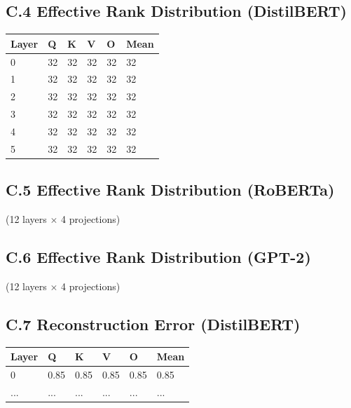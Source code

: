 \subsection{C.4 Effective Rank Distribution (DistilBERT)}

\begin{table}[H]
\centering
\small
\begin{tabular}{llllll}
\toprule
\textbf{Layer} & \textbf{Q} & \textbf{K} & \textbf{V} & \textbf{O} & \textbf{Mean} \\
\midrule
0 & 32 & 32 & 32 & 32 & 32 \\
1 & 32 & 32 & 32 & 32 & 32 \\
2 & 32 & 32 & 32 & 32 & 32 \\
3 & 32 & 32 & 32 & 32 & 32 \\
4 & 32 & 32 & 32 & 32 & 32 \\
5 & 32 & 32 & 32 & 32 & 32 \\
\bottomrule
\end{tabular}
\end{table}

\subsection{C.5 Effective Rank Distribution (RoBERTa)}

(12 layers $\times$ 4 projections)

\subsection{C.6 Effective Rank Distribution (GPT-2)}

(12 layers $\times$ 4 projections)

\subsection{C.7 Reconstruction Error (DistilBERT)}

\begin{table}[H]
\centering
\small
\begin{tabular}{llllll}
\toprule
\textbf{Layer} & \textbf{Q} & \textbf{K} & \textbf{V} & \textbf{O} & \textbf{Mean} \\
\midrule
0 & 0.85 & 0.85 & 0.85 & 0.85 & 0.85 \\
... & ... & ... & ... & ... & ... \\
\bottomrule
\end{tabular}
\end{table}

